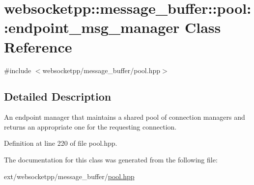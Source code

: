 \hypertarget{classwebsocketpp_1_1message__buffer_1_1pool_1_1endpoint__msg__manager}{}\section{websocketpp\+:\+:message\+\_\+buffer\+:\+:pool\+:\+:endpoint\+\_\+msg\+\_\+manager Class Reference}
\label{classwebsocketpp_1_1message__buffer_1_1pool_1_1endpoint__msg__manager}


{\ttfamily \#include $<$websocketpp/message\+\_\+buffer/pool.\+hpp$>$}



\subsection{Detailed Description}
An endpoint manager that maintains a shared pool of connection managers and returns an appropriate one for the requesting connection. 

Definition at line 220 of file pool.\+hpp.



The documentation for this class was generated from the following file\+:\begin{DoxyCompactItemize}
\item 
ext/websocketpp/message\+\_\+buffer/\hyperlink{pool_8hpp}{pool.\+hpp}\end{DoxyCompactItemize}
